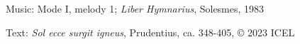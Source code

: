 




\begin{hymnsource}
Music: Mode I, melody 1; \emph{Liber Hymnarius}, Solesmes, 1983

Text: \emph{Sol ecce surgit igneus}, Prudentius, ca. 348-405, © 2023 ICEL
\end{hymnsource}
